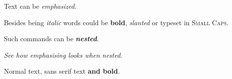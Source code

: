 \documentclass{article}
\begin{document}
{\sffamily
Text can be {\em emphasized}.

Besides being {\itshape italic} words could be {\bfseries bold}, {\slshape slanted} or typeset in {\scshape Small Caps}.

Such commands can be {\itshape\bfseries nested}.}

{\em See how { emphasising} looks when nested.}

Normal text, {\sffamily sans serif text {\bfseries and bold}}.
\end{document}

